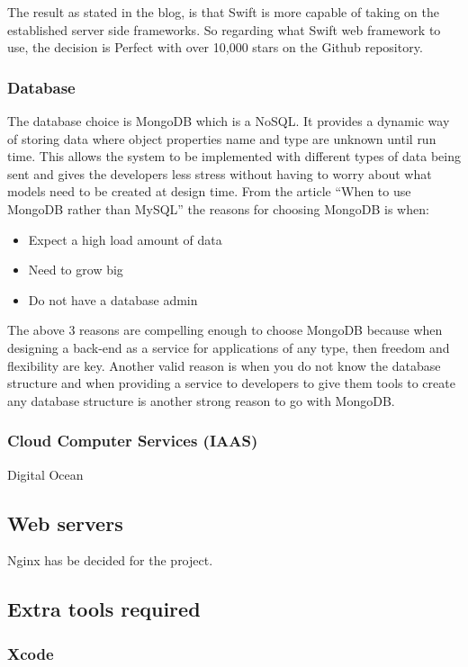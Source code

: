 The result as stated in the blog, is that Swift is more capable of taking on the established server side frameworks. So regarding what Swift web framework to use, the decision is Perfect with over 10,000 stars on the Github repository. \cite{github1} 

\subsubsection{Database}
The database choice is MongoDB which is a NoSQL. It provides a dynamic way of storing data where object properties name and type are unknown until run time. This allows the system to be implemented with different types of data being sent and gives the developers less stress without having to worry about what models need to be created at design time. From the article “When to use MongoDB rather than MySQL” \cite{database} the reasons for choosing MongoDB is when:
\begin{itemize}
  \item Expect a high load amount of data
  \item Need to grow big 
  \item Do not have a database admin
\end{itemize}
The above 3 reasons are compelling enough to choose MongoDB because when designing a back-end as a service for applications of any type, then freedom and flexibility are key. Another valid reason is when you do not know the database structure and when providing a service to developers to give them tools to create any database structure is another strong reason to go with MongoDB. 

\subsubsection{Cloud Computer Services (IAAS)}
Digital Ocean

\subsection{Web servers}
Nginx has be decided for the project.

\subsection{Extra tools required}

\subsubsection{Xcode}

